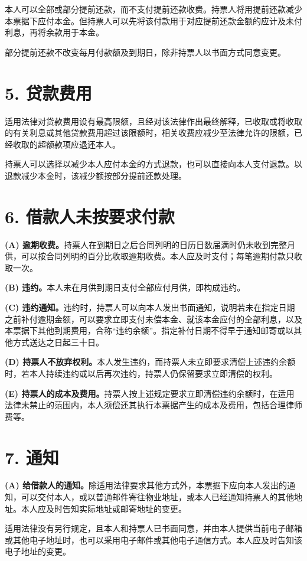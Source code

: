 \documentclass[UTF8,fontset=none,11pt,a4paper]{ctexart}
\begin{document}
本人可以全部或部分提前还款，而不支付提前还款收费。持票人将用提前还款减少本票据下应付本金。但持票人可以先将该付款用于对应提前还款金额的应计及未付利息，再将余款用于本金。


部分提前还款不改变每月付款额及到期日，除非持票人以书面方式同意变更。


\section*{5. 贷款费用}
适用法律对贷款费用设有最高限额，且经对该法律作出最终解释，已收取或将收取的有关利息或其他贷款费用超过该限额时，相关收费应减少至法律允许的限额，已经收取的超额款项应退还本人。


持票人可以选择以减少本人应付本金的方式退款，也可以直接向本人支付退款。以退款减少本金时，该减少额按部分提前还款处理。


\section*{6. 借款人未按要求付款}
\textbf{(A) 逾期收费。}持票人在到期日之后合同列明的日历日数届满时仍未收到完整月供，可以按合同列明的百分比收取逾期收费。本人应及时支付；每笔逾期付款只收取一次。


\textbf{(B) 违约。}本人未在月供到期日支付全部应付月供，即构成违约。


\textbf{(C) 违约通知。}违约时，持票人可以向本人发出书面通知，说明若未在指定日期之前补付逾期金额，可以要求立即支付未偿本金、就该本金应付的全部利息，以及本票据下其他到期费用，合称“违约余额”。指定补付日期不得早于通知邮寄或以其他方式送达之日起三十日。


\textbf{(D) 持票人不放弃权利。}本人发生违约，而持票人未立即要求清偿上述违约余额时，若本人持续违约或以后再次违约，持票人仍保留要求立即清偿的权利。


\textbf{(E) 持票人的成本及费用。}持票人按上述规定要求立即清偿违约余额时，在适用法律未禁止的范围内，本人须偿还其执行本票据产生的成本及费用，包括合理律师费等。


\section*{7. 通知}
\textbf{(A) 给借款人的通知。}除适用法律要求其他方式外，本票据下应向本人发出的通知，可以交付本人，或以普通邮件寄往物业地址，或本人已经通知持票人的其他地址。本人应及时告知实际地址或邮寄地址的变更。


适用法律没有另行规定，且本人和持票人已书面同意，并由本人提供当前电子邮箱或其他电子地址时，也可以采用电子邮件或其他电子通信方式。本人应及时告知该电子地址的变更。
\end{document}
